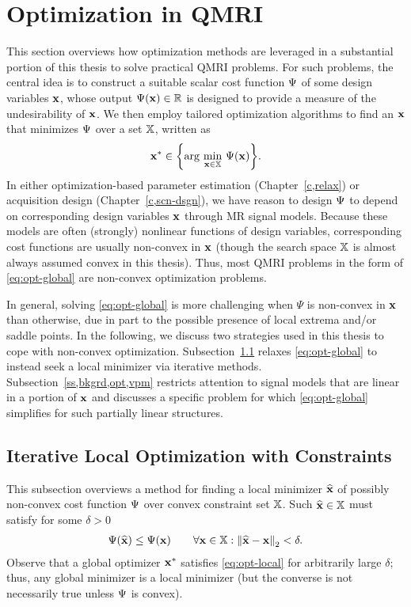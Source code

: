 \section{Optimization in QMRI}
\label{s,bkgrd,opt}

This section overviews 
how optimization methods are leveraged 
in a substantial portion of this thesis 
to solve practical QMRI problems.
For such problems,
the central idea is to construct
a suitable scalar cost function $\Psi$
of some design variables $\mathbf{x}$,
whose output $\costa{\bmx} \in \real$ 
is designed to provide a measure
of the undesirability of $\mathbf{x}$.
We then employ 
tailored optimization algorithms
to find an $\mathbf{x}$
that minimizes $\Psi$
over a set $\mathbb{X}$,
written as
\begin{align}
	\bmx^* \in \set{\argmin{\bmx\in\setX} \costa{\bmx}}.
	\label{eq:opt-global}
\end{align}
In either optimization-based 
parameter estimation (Chapter~\ref{c,relax})
or acquisition design (Chapter~\ref{c,scn-dsgn}),
we have reason to design $\Psi$
to depend on corresponding design variables $\mathbf{x}$ 
through MR signal models.
Because these models are often 
(strongly) nonlinear functions
of design variables,
corresponding cost functions
are usually non-convex in $\mathbf{x}$
(though the search space $\mathbb{X}$ 
is almost always assumed convex
in this thesis).
Thus,
most QMRI problems
in the form of \eqref{eq:opt-global}
are non-convex optimization problems.

In general, 
solving \eqref{eq:opt-global}
is more challenging when 
$\Psi$ is non-convex in $\mathbf{x}$
than otherwise,
due in part to the possible presence
of local extrema and/or saddle points.
In the following, 
we discuss two strategies 
used in this thesis 
to cope with non-convex optimization.
Subsection~\ref{ss,bkgrd,opt,loc}
relaxes \eqref{eq:opt-global}
to instead seek a local minimizer
via iterative methods.
Subsection~\ref{ss,bkgrd,opt,vpm}
restricts attention 
to signal models 
that are linear in a portion of $\mathbf{x}$
and discusses a specific problem
for which \eqref{eq:opt-global} simplifies 
for such partially linear structures.

\subsection{Iterative Local Optimization with Constraints}
\label{ss,bkgrd,opt,loc}

This subsection overviews
a method for finding a local minimizer $\widehat{\mathbf{x}}$
of possibly non-convex cost function $\Psi$
over convex constraint set $\mathbb{X}$.
Such $\widehat{\mathbf{x}} \in \mathbb{X}$ must satisfy
for some $\delta>0$
\begin{align}
	\costa{\est{\bmx}} \leq \costa{\bmx} \qquad
		\forall \bmx \in \setX : \norm{\est{\bmx}-\bmx}_2 < \delta.
		\label{eq:opt-local}
\end{align}	
Observe that
a global optimizer $\mathbf{x}^*$ 
satisfies \eqref{eq:opt-local}
for arbitrarily large $\delta$;
thus, any global minimizer 
is a local minimizer
(but the converse is not necessarily true
unless $\Psi$ is convex).

